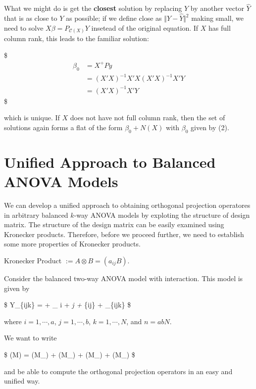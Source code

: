 \documentclass[
]{book}
\begin{document}
{{{What we might do is get the \textbf{closest} solution by replacing \(Y\) by another vector \(\hat Y\) that is as close to \(Y\) as possible; if we define close as \(\Vert Y - \hat Y \Vert^2\) making small, we need to solve \(X \beta = P_{\mathcal{C}(X)}Y\) insetead of the original equation. If \(X\) has full column rank, this leads to the familiar solution:

\$
\begin{align}
\beta_0 &= X^+ P y

\\
&= (X'X)^{-1} X' X (X'X)^{-1}X' Y

\\

& = (X'X)^{-1}X'Y

\tag{2}

\end{align}
\$

which is unique. If \(X\) does not have not full column rank, then the set of solutions again forms a flat of the form \(\beta_0 + N(X)\) with \(\beta_0\) given by (2).

\hypertarget{unified-approach-to-balanced-anova-models}{%
\section{Unified Approach to Balanced ANOVA Models}\label{unified-approach-to-balanced-anova-models}}

We can develop a unified approach to obtaining orthogonal projection operatores in arbitrary balanced \(k\)-way ANOVA models by exploting the structure of design matrix. The structure of the design matrix can be easily examined using Kronecker products. Therefore, before we proceed further, we need to establish some more properties of Kronecker products.

Kronecker Product \(:= A \otimes B = (a_{ij}B)\).

Consider the balanced two-way ANOVA model with interaction. This model is given by

\$
Y\_\{ijk\} = \mu + \alpha\_ i + \eta\emph{j + \gamma}\{ij\} + \epsilon\_\{ijk\}
\$

where \(i=1, \cdots, a\), \(j=1, \cdots, b\), \(k=1, \cdots, N\), and \(n=abN\).

We want to write

\$
(M) = (M\_\mu) + (M\_\alpha) + (M\_\eta) + (M\_\gamma)
\$

and be able to compute the orthogonal projection operators in an easy and unified way.

}}}
\end{document}
